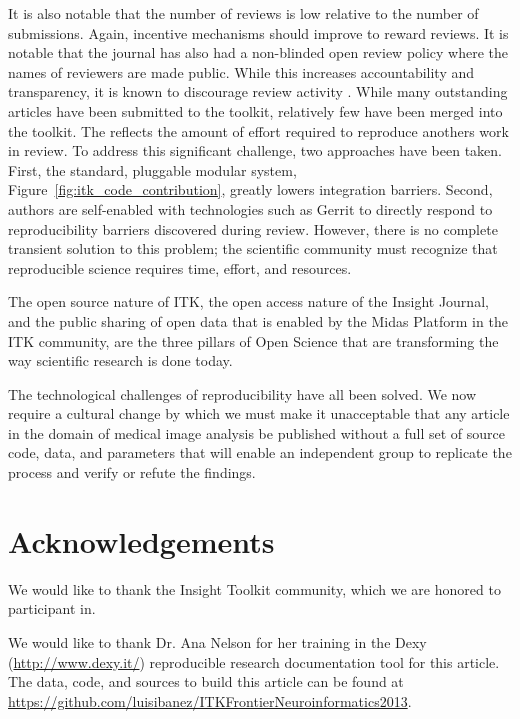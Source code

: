\documentclass{frontiersENG} %
\begin{document}
It is also notable that the number of reviews is low relative to the number of
submissions. Again, incentive mechanisms should improve to reward reviews.  It
is notable that the journal has also had a non-blinded open review policy
where the names of reviewers are made public. While this increases
accountability and transparency, it is known to discourage review activity
\cite{Rooyen1999,Walsh2000}. While many outstanding articles have been
submitted to the toolkit, relatively few have been merged into the toolkit.
The reflects the amount of effort required to reproduce anothers work in
review.  To address this significant challenge, two approaches have been
taken.  First, the standard, pluggable modular system,
Figure~\ref{fig:itk_code_contribution}, greatly lowers integration barriers.
Second, authors are self-enabled with technologies such as Gerrit to directly respond
to reproducibility barriers discovered during review. However, there is no
complete transient solution to this
problem; the scientific community must recognize that reproducible science
requires time, effort, and resources.

The open source nature of ITK, the open access nature of the Insight Journal,
and the public sharing of open data that is enabled by the Midas Platform in
the ITK community, are the three pillars of Open Science that are transforming
the way scientific research is done today.

The technological challenges of reproducibility have all been solved. We now
require a cultural change by which we must make it unacceptable that any
article in the domain of medical image analysis be published without a full
set of source code, data, and parameters that will enable an independent group
to replicate the process and verify or refute the findings.

\section*{Acknowledgements}

We would like to thank the Insight Toolkit community, which we are honored to
participant in.

We would like to thank Dr. Ana Nelson for her training in the Dexy
(\url{http://www.dexy.it/}) reproducible research documentation tool for this
article.  The data, code, and sources to build this article can be found at
\url{https://github.com/luisibanez/ITKFrontierNeuroinformatics2013}.
\end{document}
